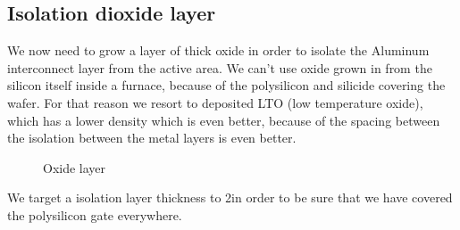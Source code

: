 \newpage

\subsection{Isolation dioxide layer}

We now need to grow a layer of thick oxide in order to isolate the Aluminum interconnect layer from the active area.
We can't use oxide grown in from the silicon itself inside a furnace, because of the polysilicon and silicide covering the wafer.
For that reason we resort to deposited LTO (low temperature oxide), which has a lower density which is even better, because of the spacing between the isolation between the metal layers is even better.

\begin{figure}[H]
	\centering
	\begin{tikzpicture}[node distance = 3cm, auto, thick,scale=\CrossSectionOnly, every node/.style={transform shape}]
		
	\end{tikzpicture}
	\begin{tikzpicture}[node distance = 3cm, auto, thick,scale=\CrossSectionOnly, every node/.style={transform shape}]
		
	\end{tikzpicture}
	\begin{tikzpicture}[node distance = 3cm, auto, thick,scale=\CrossSectionOnly, every node/.style={transform shape}]
		
	\end{tikzpicture}
	\caption{Oxide layer}
\end{figure}

We target a isolation layer thickness to 2\um in order to be sure that we have covered the polysilicon gate everywhere.

